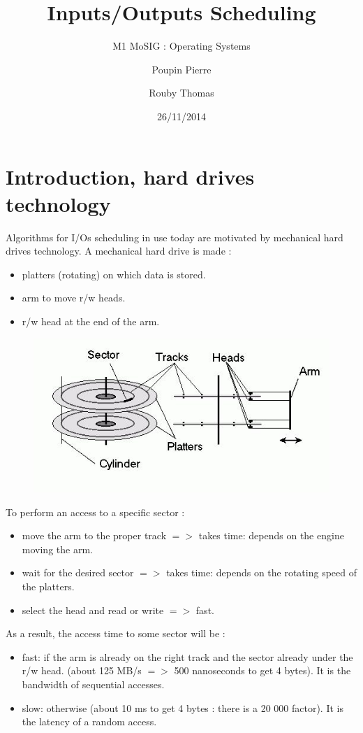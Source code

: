 \documentclass[a4paper,10pt]{article}
\title{\textbf{Inputs/Outputs Scheduling}}
\subtitle{M1 MoSIG : Operating Systems}
\author{Poupin Pierre \and Rouby Thomas}
\date{26/11/2014}
\begin{document}
\maketitle

\section{Introduction, hard drives technology}

Algorithms for I/Os scheduling in use today are motivated by mechanical hard drives technology.
A mechanical hard drive is made :
\begin{itemize}
  \item platters (rotating) on which data is stored.
  \item arm to move r/w heads.
  \item r/w head at the end of the arm.
\end{itemize}

\begin{figure}[h!]
  \begin{center}
    \includegraphics{hard_drive_picture.jpg}
  \end{center}
\end{figure}

To perform an access to a specific sector :
\begin{itemize}
  \item move the arm to the proper track
  $=>$ takes time: depends on the engine moving the arm.
  \item wait for the desired sector
   $=>$ takes time: depends on the rotating speed of the platters.
  \item select the head and read or write
  $=>$ fast.
\end{itemize}

As a result, the access time to some sector will be :
\begin{itemize}
  \item fast: if the arm is already on the right track and the sector already under the r/w head. (about 125 MB/s $=>$ 500 nanoseconds to get 4 bytes).
  It is the bandwidth of sequential accesses.
  \item slow: otherwise (about 10 ms to get 4 bytes : there is a 20 000 factor).
  It is the latency of a random access.
  
\end{itemize}
\end{document}

